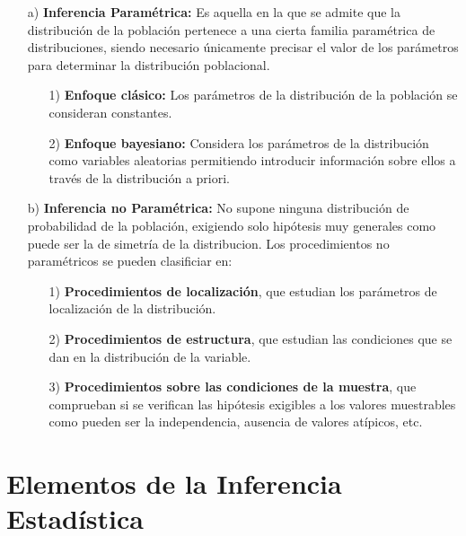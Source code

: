 \begin{enumerate}
    \item[a)] \textbf{Inferencia Paramétrica:} Es aquella en la que se admite que la distribución de la población pertenece a una cierta familia paramétrica de distribuciones, siendo necesario únicamente precisar el valor de los parámetros para determinar la distribución poblacional.
    \begin{enumerate}
        \item[1)] \textbf{Enfoque clásico:} Los parámetros de la distribución de la población se consideran constantes.
        \item[2)] \textbf{Enfoque bayesiano:} Considera los parámetros de la distribución como variables aleatorias permitiendo introducir información sobre ellos a través de la distribución a priori.
    \end{enumerate}
    \item[b)] \textbf{Inferencia no Paramétrica:} No supone ninguna distribución de probabilidad de la población, exigiendo solo hipótesis muy generales como puede ser la de simetría de la distribucion. Los procedimientos no paramétricos se pueden clasificiar en:
    \begin{enumerate}
        \item[1)] \textbf{Procedimientos de localización}, que estudian los parámetros de localización de la distribución.
        \item[2)] \textbf{Procedimientos de estructura}, que estudian las condiciones que se dan en la distribución de la variable.
        \item[3)] \textbf{Procedimientos sobre las condiciones de la muestra}, que comprueban si se verifican las hipótesis exigibles a los valores muestrables como pueden ser la independencia, ausencia de valores atípicos, etc.
    \end{enumerate}
\end{enumerate}

\section{Elementos de la Inferencia Estadística}

